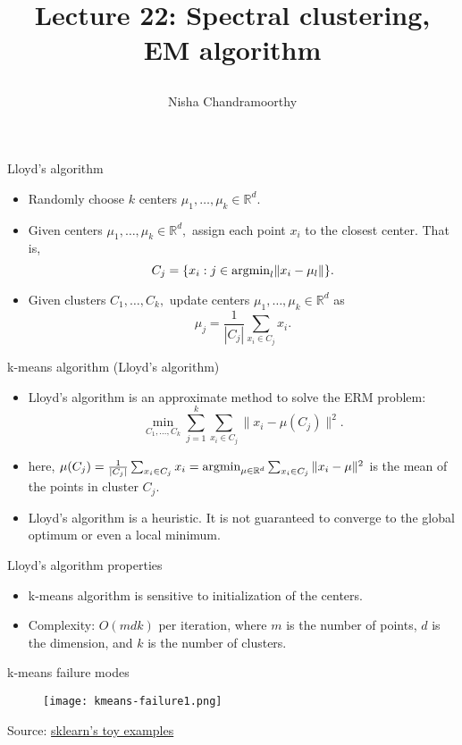 \documentclass[final]{beamer}
\title{\begin{huge}{Lecture 22: Spectral clustering, EM algorithm}\end{huge}} %
\author{Nisha Chandramoorthy} %
\begin{document}
\frame{\titlepage}

\begin{frame}{Lloyd's algorithm}
	\begin{itemize}
		\item Randomly choose $k$ centers $\mu_1, \ldots, \mu_k \in \mathbb{R}^d.$
		\pause
	\item Given centers $\mu_1, \ldots, \mu_k \in \mathbb{R}^d,$ assign each point $x_i$ to the closest center. That is, $$C_j = \{x_i: j \in {\rm arg min}_l \|x_i - \mu_{l}\|\}.$$
		\pause
	\item Given clusters $C_1, \ldots, C_k,$ update centers $\mu_1, \ldots, \mu_k \in \mathbb{R}^d$ as $$\mu_j = \frac{1}{|C_j|} \sum_{x_i \in C_j} x_i.$$
		
	\end{itemize}
\end{frame}
\begin{frame}{k-means algorithm (Lloyd's algorithm)}
	\begin{itemize}
		\item Lloyd's algorithm is an approximate method to solve the ERM problem: $$\min_{C_1, \ldots, C_k} \sum_{j=1}^k \sum_{x_i \in C_j} \|x_i - \mu(C_j)\|^2.$$
		\pause
		\item here, $\mu(C_j) = \frac{1}{|C_j|} \sum_{x_i \in C_j} x_i = {\rm argmin}_{\mu \in \mathbb{R}^d} \sum_{x_i \in C_j} \|x_i - \mu\|^2$ is the mean of the points in cluster $C_j.$
		\pause
		\item Lloyd's algorithm is a heuristic. It is not guaranteed to converge to the global optimum or even a local minimum.
	\end{itemize}
\end{frame}
\begin{frame}{Lloyd's algorithm properties}
	\begin{itemize}
		\item k-means algorithm is sensitive to initialization of the centers.
		\pause
		\item Complexity: $O(mdk)$ per iteration, where $m$ is the number of points, $d$ is the dimension, and $k$ is the number of clusters.	
	\end{itemize}
\end{frame}
\begin{frame}{k-means failure modes}
	\begin{figure}
		\texttt{[image: kmeans-failure1.png]}
\end{figure}
	Source: \href{https://scikit-learn.org/stable/auto_examples/cluster/plot_kmeans_assumptions.html\#sphx-glr-auto-examples-cluster-plot-kmeans-assumptions-py}{sklearn's toy examples}
\end{frame}
\end{document}
